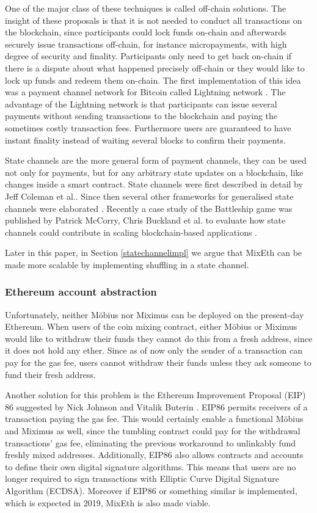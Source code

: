 \documentclass[a4paper]{article}
\theoremstyle{definition}
\begin{document}
One of the major class of these techniques is called off-chain solutions. The insight of these proposals is that it is not needed to conduct all transactions on the blockchain, since participants could lock funds on-chain and afterwards securely issue transactions off-chain, for instance micropayments, with high degree of security and finality. Participants only need to get back on-chain if there is a dispute about what happened precisely off-chain or they would like to lock up funds and redeem them on-chain. The first implementation of this idea was a payment channel network for Bitcoin called Lightning network \cite{poon2016bitcoin}. The advantage of the Lightning network is that participants can issue several payments without sending transactions to the blockchain and paying the sometimes costly transaction fees. Furthermore users are guaranteed to have instant finality instead of waiting several blocks to confirm their payments. 

State channels are the more general form of payment channels, they can be used not only for payments, but for any arbitrary state updates on a blockchain, like changes inside a smart contract. State channels were first described in detail by Jeff Coleman et al.\cite{coleman2018counterfactual}. Since then several other frameworks for generalised state channels were elaborated \cite{dziembowski2017perun,mccorryyou}. Recently a case study of the Battleship game was published by Patrick McCorry, Chris Buckland et al. to evaluate how state channels could contribute in scaling blockchain-based applications \cite{mccorryyou}.  

Later in this paper, in Section \ref{statechannelimpl} we argue that MixEth can be made more scalable by implementing shuffling in a state channel. 

\subsubsection{Ethereum account abstraction}
Unfortunately, neither Möbius nor Miximus can be deployed on the present-day Ethereum. When users of the coin mixing contract, either Möbius or Miximus would like to withdraw their funds they cannot do this from a fresh address, since it does not hold any ether. Since as of now only the sender of a transaction can pay for the gas fee, users cannot withdraw their funds unless they ask someone to fund their fresh address.     

Another solution for this problem is the Ethereum Improvement Proposal (EIP) 86 suggested by Nick Johnson and Vitalik Buterin \cite{buterin2017accounteip}. EIP86 permits receivers of a transaction paying the gas fee. This would certainly enable a functional Möbius and Miximus as well, since the tumbling contract could pay for the withdrawal transactions' gas fee, eliminating the previous workaround to unlinkably fund freshly mixed addresses. Additionally, EIP86 also allows contracts and accounts to define their own digital signature algorithms. This means that users are no longer required to sign transactions with Elliptic Curve Digital Signature Algorithm (ECDSA). Moreover if EIP86 or something similar is implemented, which is expected in 2019, MixEth is also made viable.  
\end{document}
